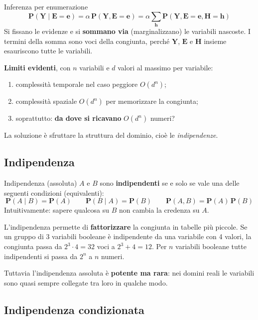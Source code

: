 \documentclass[11pt, a4paper]{article}
\renewcommand{\emph}[1]{\textcolor{verdechiaro}{\itshape #1}}
\newcommand{\Pv}{\mathbf{P}}               %
\begin{document}
\begin{chiave}{Inferenza per enumerazione}
  \[
    \Pv(\mathbf{Y} \mid \mathbf{E} = \mathbf{e})
    = \alpha\, \Pv(\mathbf{Y}, \mathbf{E} = \mathbf{e})
    = \alpha \sum_{\mathbf{h}} \Pv(\mathbf{Y}, \mathbf{E} = \mathbf{e}, \mathbf{H} = \mathbf{h})
  \]
  Si fissano le evidenze e si \textbf{sommano via} (marginalizzano) le variabili nascoste. I termini della somma sono voci della congiunta, perché $\mathbf{Y}$, $\mathbf{E}$ e $\mathbf{H}$ insieme esauriscono tutte le variabili.
\end{chiave}

\textbf{Limiti evidenti}, con $n$ variabili e $d$ valori al massimo per variabile:
\begin{enumerate}
  \item complessità temporale nel caso peggiore $O(d^n)$;
  \item complessità spaziale $O(d^n)$ per memorizzare la congiunta;
  \item soprattutto: \textbf{da dove si ricavano} $O(d^n)$ numeri?
\end{enumerate}
La soluzione è sfruttare la struttura del dominio, cioè le \emph{indipendenze}.

\subsection{Indipendenza}

\begin{defbox}{Indipendenza (assoluta)}
  $A$ e $B$ sono \textbf{indipendenti} se e solo se vale una delle seguenti condizioni (equivalenti):
  \[
    \Pv(A \mid B) = \Pv(A) \qquad \Pv(B \mid A) = \Pv(B) \qquad \Pv(A, B) = \Pv(A)\,\Pv(B)
  \]
  Intuitivamente: sapere qualcosa su $B$ non cambia la credenza su $A$.
\end{defbox}

L'indipendenza permette di \textbf{fattorizzare} la congiunta in tabelle più piccole. Se un gruppo di 3 variabili booleane è indipendente da una variabile con 4 valori, la congiunta passa da $2^3 \cdot 4 = 32$ voci a $2^3 + 4 = 12$. Per $n$ variabili booleane tutte indipendenti si passa da $2^n$ a $n$ numeri.

Tuttavia l'indipendenza assoluta è \textbf{potente ma rara}: nei domini reali le variabili sono quasi sempre collegate tra loro in qualche modo.

\subsection{Indipendenza condizionata}
\end{document}
